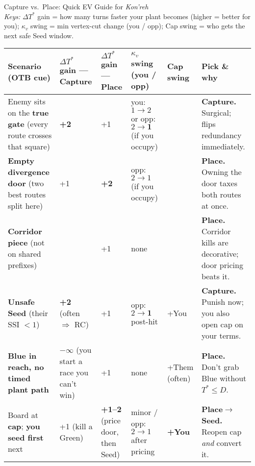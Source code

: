 \documentclass[11pt]{article}
\newcommand{\Tstar}{T^\ast}
\newcommand{\D}{D}
\newcommand{\kappav}{\kappa_v}
\newcommand{\dT}{\Delta \Tstar}
\renewcommand{\arraystretch}{1.15}
\begin{document}
\bigskip
\begin{center}
  {\LARGE Capture vs.\ Place: Quick EV Guide for \textit{Kon'reh}}\\[4pt]
  \small\emph{Keys:}
  $\dT$ gain = how many turns faster your plant becomes (higher = better for you);\;
  $\kappav$ swing = min vertex-cut change (you / opp);\;
  Cap swing = who gets the next safe Seed window.
  \end{center}
  
  \renewcommand{\arraystretch}{1.25}
  \setlength{\tabcolsep}{6pt}
  \small
  \begin{tabularx}{\textwidth}{>{\raggedright\arraybackslash}X
  >{\raggedleft\arraybackslash}p{1.7cm}
  >{\raggedleft\arraybackslash}p{1.8cm}
  >{\raggedright\arraybackslash}p{3.0cm}
  >{\raggedright\arraybackslash}p{1.7cm}
  >{\raggedright\arraybackslash}X}
  \toprule
  \textbf{Scenario (OTB cue)} & \textbf{$\dT$ gain — Capture} & \textbf{$\dT$ gain — Place} & \textbf{$\kappav$ swing (you / opp)} & \textbf{Cap swing} & \textbf{Pick \& why}\\
  \midrule
  Enemy sits on the \textbf{true gate} (every route crosses that square) & \textbf{+2} & +1 & you: \textbf{$1 \!\to\! 2$} \; or \; opp: $2 \!\to\! \textbf{1}$ (if you occupy) & 0 & \textbf{Capture.} Surgical; flips redundancy immediately.\\
  \addlinespace
  \textbf{Empty divergence door} (two best routes split here) & +1 & \textbf{+2} & opp: \textbf{$2 \!\to\! 1$} (if you occupy) & 0 & \textbf{Place.} Owning the door taxes both routes at once.\\
  \addlinespace
  \textbf{Corridor piece} (not on shared prefixes) & 0 & +1 & none & 0 & \textbf{Place.} Corridor kills are decorative; door pricing beats it.\\
  \addlinespace
  \textbf{Unsafe Seed} (their SSI $< 1$) & \textbf{+2} (often $\Rightarrow$ RC) & +1 & opp: $2 \!\to\! \textbf{1}$ post-hit & +You & \textbf{Capture.} Punish now; you also open cap on your terms.\\
  \addlinespace
  \textbf{Blue in reach, no timed plant path} & $\boldsymbol{-\infty}$ (you start a race you can't win) & +1 & none & +Them (often) & \textbf{Place.} Don't grab Blue without $\Tstar \le \D$.\\
  \addlinespace
  Board at \textbf{cap}; \textbf{you seed first} next & +1 (kill a Green) & \textbf{+1--2} (price door, then Seed) & minor / opp: $2 \!\to\! 1$ after pricing & \textbf{+You} & \textbf{Place$\to$Seed.} Reopen cap \emph{and} convert it.\\

\end{tabularx}
\end{document}
